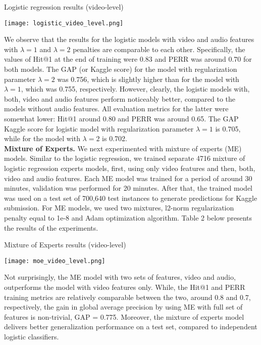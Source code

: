 \documentclass{sig-alternate-05-2015}
\begin{document}
	\begin{table}[h!]
	\noindent
	\small\caption{Logistic regression results (video-level)}\small
  	\texttt{[image: logistic\_video\_level.png]}
	\end{table}

We observe that the results for the logistic models with video and audio features with $\lambda = 1$ and  $\lambda = 2$ penalties are comparable to each other. Specifically, the values of Hit@1 at the end of training were 0.83 and PERR was around 0.70 for both models. The GAP (or Kaggle score) for the model with regularization parameter $\lambda = 2$ was 0.756, which is slightly higher than for the model with $\lambda = 1$, which was 0.755, respectively.  However, clearly, the logistic models with, both, video and audio features perform noticeably better, compared to the models without audio features. All evaluation metrics for the latter were somewhat lower: Hit@1 around 0.80 and PERR was around 0.65. The GAP Kaggle score for logistic model with regularization parameter $\lambda = 1$ is 0.705, while for the model with $\lambda = 2$ is 0.702. \\


\noindent 
\textbf{Mixture of Experts.}
We next experimented with mixture of experts (ME) models. Similar to the logistic regression, we trained separate 4716 mixture of logistic regression experts models, first, using only video features and then, both, video and audio features. Each ME model was trained for a period of around 30 minutes, validation was performed for 20 minutes. After that, the trained model was used on a test set of 700,640 test instances to generate predictions for Kaggle submission. For ME models, we used two mixtures, l2-norm regularization penalty equal to 1e-8 and Adam optimization algorithm. Table 2 below presents the results of the experiments. 

	\begin{table}[h!]
	\noindent
	\small\caption{Mixture of Experts results (video-level)}\small
  	\texttt{[image: moe\_video\_level.png]}
	\end{table}

Not surprisingly, the ME model with two sets of features, video and audio, outperforms the model with video features only. While, the Hit@1 and PERR training metrics are relatively comparable between the two, around 
0.8 and 0.7, respectively, the gain in global average precision by using ME with full set of features is non-trivial, GAP = 0.775. Moreover, the mixture of experts model delivers better generalization performance on a test set, compared to independent logistic classifiers. \\
\end{document}
